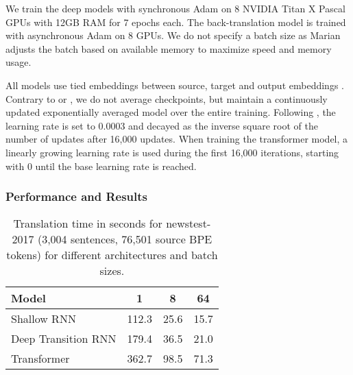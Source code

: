 \documentclass[11pt,a4paper]{article}
\begin{document}
We train the deep models with synchronous Adam on 8 NVIDIA Titan X Pascal GPUs with 12GB RAM for 7 epochs each. The back-translation model is trained with asynchronous Adam on 8 GPUs. We do not specify a batch size as Marian adjusts the batch based on available memory to maximize speed and memory usage. %

All models use tied embeddings between source, target and output embeddings \cite{press2017using}. Contrary to  or , we do not average checkpoints, but maintain a continuously updated exponentially averaged model over the entire training. Following , the learning rate is set to 0.0003 and decayed as the inverse square root of the number of updates after 16,000 updates. When training the transformer model, a linearly growing learning rate is used during the first 16,000 iterations, starting with 0 until the base learning rate is reached. 

\subsubsection{Performance and Results}

\begin{table}[t]
\centering
\begin{tabular}{lccc}\toprule
Model & 1 & 8 & 64 \\ \midrule
Shallow RNN & 112.3 & 25.6 & 15.7\\
Deep Transition RNN & 179.4 & 36.5 & 21.0\\
Transformer & 362.7 & 98.5 & 71.3\\ \bottomrule
\end{tabular}
\caption{Translation time in seconds for newstest-2017 (3,004 sentences, 76,501 source BPE tokens) for different architectures and batch sizes.}
\label{tab-trans}
\end{table}



\end{document}
